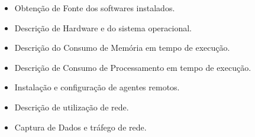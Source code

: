 
\begin{itemize}
  \item Obtenção de Fonte dos softwares instalados.
  \item Descrição de Hardware e do sistema operacional.
  \item Descrição do Consumo de Memória em tempo de execução.
  \item Descrição de Consumo de Processamento em tempo de execução.
  \item Instalação e configuração de agentes remotos.
  \item Descrição de utilização de rede.
  \item Captura de Dados e tráfego de rede.
\end{itemize}



